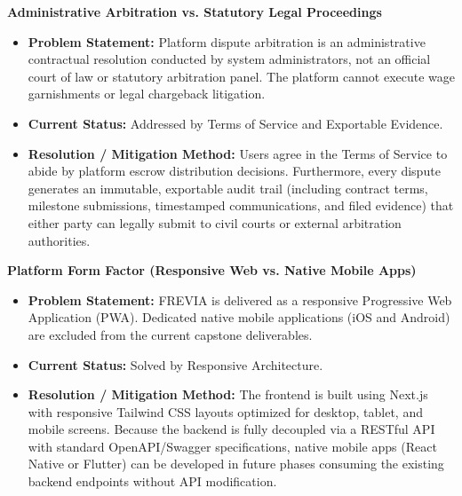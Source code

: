\begin{description}[leftmargin=2.0cm,labelwidth=1.8cm,align=left,font=\normalfont\bfseries]
\item[LI-08] \textbf{Administrative Arbitration vs. Statutory Legal Proceedings}
\begin{itemize}[leftmargin=0.5cm, label=--]
\item \textbf{Problem Statement:} Platform dispute arbitration is an administrative contractual resolution conducted by system administrators, not an official court of law or statutory arbitration panel. The platform cannot execute wage garnishments or legal chargeback litigation.
\item \textbf{Current Status:} Addressed by Terms of Service and Exportable Evidence.
\item \textbf{Resolution / Mitigation Method:} Users agree in the Terms of Service to abide by platform escrow distribution decisions. Furthermore, every dispute generates an immutable, exportable audit trail (including contract terms, milestone submissions, timestamped communications, and filed evidence) that either party can legally submit to civil courts or external arbitration authorities.
\end{itemize}

\item[LI-09] \textbf{Platform Form Factor (Responsive Web vs. Native Mobile Apps)}
\begin{itemize}[leftmargin=0.5cm, label=--]
\item \textbf{Problem Statement:} FREVIA is delivered as a responsive Progressive Web Application (PWA). Dedicated native mobile applications (iOS and Android) are excluded from the current capstone deliverables.
\item \textbf{Current Status:} Solved by Responsive Architecture.
\item \textbf{Resolution / Mitigation Method:} The frontend is built using Next.js with responsive Tailwind CSS layouts optimized for desktop, tablet, and mobile screens. Because the backend is fully decoupled via a RESTful API with standard OpenAPI/Swagger specifications, native mobile apps (React Native or Flutter) can be developed in future phases consuming the existing backend endpoints without API modification.
\end{itemize}


\end{description}
